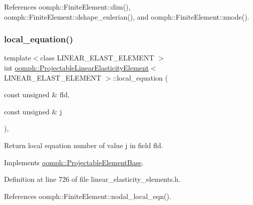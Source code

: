 References oomph\+::\+Finite\+Element\+::dim(), oomph\+::\+Finite\+Element\+::dshape\+\_\+eulerian(), and oomph\+::\+Finite\+Element\+::nnode().

\mbox{\label{classoomph_1_1ProjectableLinearElasticityElement_a0311cfae0d3bf571be30bee3c848543c}} 
\subsubsection{\texorpdfstring{local\+\_\+equation()}{local\_equation()}}
{\footnotesize\ttfamily template$<$class L\+I\+N\+E\+A\+R\+\_\+\+E\+L\+A\+S\+T\+\_\+\+E\+L\+E\+M\+E\+NT $>$ \\
int \hyperlink{classoomph_1_1ProjectableLinearElasticityElement}{oomph\+::\+Projectable\+Linear\+Elasticity\+Element}$<$ L\+I\+N\+E\+A\+R\+\_\+\+E\+L\+A\+S\+T\+\_\+\+E\+L\+E\+M\+E\+NT $>$\+::local\+\_\+equation (\begin{DoxyParamCaption}\item[{const unsigned \&}]{fld,  }\item[{const unsigned \&}]{j }\end{DoxyParamCaption})\hspace{0.3cm}{\ttfamily [inline]}, {\ttfamily [virtual]}}



Return local equation number of value j in field fld. 



Implements \hyperlink{classoomph_1_1ProjectableElementBase_ac5c27ae929ff636dc7747fe23fd4f738}{oomph\+::\+Projectable\+Element\+Base}.



Definition at line 726 of file linear\+\_\+elasticity\+\_\+elements.\+h.



References oomph\+::\+Finite\+Element\+::nodal\+\_\+local\+\_\+eqn().

\mbox{\label{classoomph_1_1ProjectableLinearElasticityElement_aefdb5cd9080bec31457d79ce3a888625}} 
